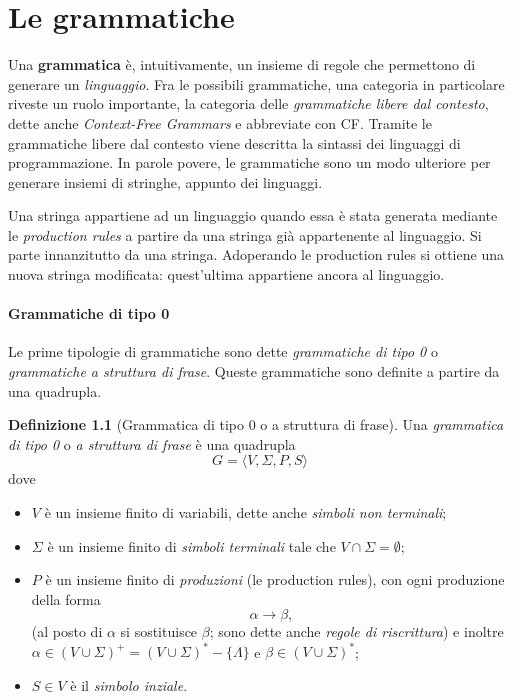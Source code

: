 \documentclass[10pt]{\classname}
\theoremstyle{definition}
\newtheorem{definizione}{Definizione}[section]
\theoremstyle{definition}
\begin{document}
\clearpage

\chapter{Le grammatiche}

Una \textbf{grammatica} è, intuitivamente, un insieme di regole che permettono
di generare un \emph{linguaggio}. Fra le possibili grammatiche, una categoria
in particolare riveste un ruolo importante, la categoria delle
\emph{grammatiche libere dal contesto}, dette anche \emph{Context-Free
Grammars} e abbreviate con CF. Tramite le grammatiche libere dal contesto viene
descritta la sintassi dei linguaggi di programmazione. In parole povere, le
grammatiche sono un modo ulteriore per generare insiemi di stringhe, appunto
dei linguaggi.

Una stringa appartiene ad un linguaggio quando essa è stata generata mediante
le \emph{production rules} a partire da una stringa già appartenente al
linguaggio. Si parte innanzitutto da una stringa. Adoperando le production
rules si ottiene una nuova stringa modificata: quest'ultima appartiene ancora
al linguaggio.

\subsubsection{Grammatiche di tipo 0}

Le prime tipologie di grammatiche sono dette \emph{grammatiche di tipo 0} o
\emph{grammatiche a struttura di frase}. Queste grammatiche sono definite a
partire da una quadrupla. 

\begin{definizione}[Grammatica di tipo 0 o a struttura di frase] Una \emph{grammatica di tipo 0} o \emph{a struttura di frase} è una quadrupla $$G = \langle V, \Sigma, P, S\rangle$$ dove 
\begin{itemize}
    \item $V$ è un insieme finito di variabili, dette anche \emph{simboli non terminali}; 
    \item $\Sigma$ è un insieme finito di \emph{simboli terminali} tale che $V \cap \Sigma =
\emptyset$; 
    \item $P$ è un insieme finito di \emph{produzioni} (le production rules),
        con ogni produzione della forma $$\alpha \rightarrow \beta,$$ (al posto
        di $\alpha$ si sostituisce $\beta$; sono dette anche \emph{regole di
        riscrittura}) e inoltre $\alpha \in (V \cup \Sigma)^+ = (V \cup
        \Sigma)^* - \{\Lambda\}$ e $\beta \in (V \cup \Sigma)^*$;
    \item $S \in V$ è il \emph{simbolo inziale}.
\end{itemize}
\end{definizione}
\end{document}
